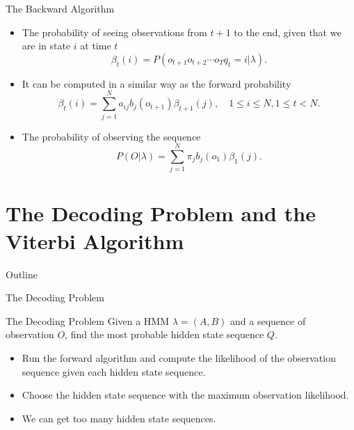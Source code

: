 \documentclass{beamer}
\begin{document}
\begin{frame}{The Backward Algorithm}
	\begin{itemize}
		\item The probability of seeing observations from $t+1$ to the end, given that we are in state $i$ at time $t$
		\begin{equation}
			\beta_t(i) = P(o_{t+1}o_{t+2}\cdots o_T q_t = i \vert \lambda).
		\end{equation}
		\item It can be computed in a similar way as the forward probability
		\begin{equation}
			\beta_t(i) = \sum_{j=1}^N a_{ij}b_j(o_{t+1})\beta_{t+1}(j), \quad 1 \leq i \leq N, 1 \leq t < N.
		\end{equation}
		\item The probability of observing the sequence
		\begin{equation}
			P(O \vert \lambda) = \sum_{j=1}^N \pi_j b_j(o_1) \beta_1(j).
		\end{equation}
	\end{itemize}
\end{frame}


\section{The Decoding Problem and the Viterbi Algorithm}
\begin{frame}{Outline}
	\tableofcontents[currentsection]
\end{frame}
\begin{frame}{The Decoding Problem }
	\begin{block}{The Decoding Problem}
		Given a HMM $\lambda = (A,B)$ and a sequence of observation $O$, find the most probable hidden state sequence $Q$.
	\end{block}
	\begin{itemize}
		\item Run the forward algorithm and compute the likelihood of the observation sequence given each hidden state sequence.
		\item Choose the hidden state sequence with the maximum observation likelihood.
		\item We can get too many hidden state sequences.
	\end{itemize}
\end{frame}
\end{document}
